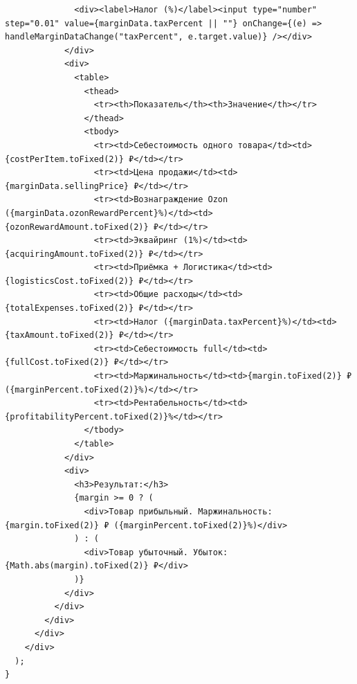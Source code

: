 \begin{code}
\begin{verbatim}
              <div><label>Налог (%)</label><input type="number" step="0.01" value={marginData.taxPercent || ""} onChange={(e) => handleMarginDataChange("taxPercent", e.target.value)} /></div>
            </div>
            <div>
              <table>
                <thead>
                  <tr><th>Показатель</th><th>Значение</th></tr>
                </thead>
                <tbody>
                  <tr><td>Себестоимость одного товара</td><td>{costPerItem.toFixed(2)} ₽</td></tr>
                  <tr><td>Цена продажи</td><td>{marginData.sellingPrice} ₽</td></tr>
                  <tr><td>Вознаграждение Ozon ({marginData.ozonRewardPercent}%)</td><td>{ozonRewardAmount.toFixed(2)} ₽</td></tr>
                  <tr><td>Эквайринг (1%)</td><td>{acquiringAmount.toFixed(2)} ₽</td></tr>
                  <tr><td>Приёмка + Логистика</td><td>{logisticsCost.toFixed(2)} ₽</td></tr>
                  <tr><td>Общие расходы</td><td>{totalExpenses.toFixed(2)} ₽</td></tr>
                  <tr><td>Налог ({marginData.taxPercent}%)</td><td>{taxAmount.toFixed(2)} ₽</td></tr>
                  <tr><td>Себестоимость full</td><td>{fullCost.toFixed(2)} ₽</td></tr>
                  <tr><td>Маржинальность</td><td>{margin.toFixed(2)} ₽ ({marginPercent.toFixed(2)}%)</td></tr>
                  <tr><td>Рентабельность</td><td>{profitabilityPercent.toFixed(2)}%</td></tr>
                </tbody>
              </table>
            </div>
            <div>
              <h3>Результат:</h3>
              {margin >= 0 ? (
                <div>Товар прибыльный. Маржинальность: {margin.toFixed(2)} ₽ ({marginPercent.toFixed(2)}%)</div>
              ) : (
                <div>Товар убыточный. Убыток: {Math.abs(margin).toFixed(2)} ₽</div>
              )}
            </div>
          </div>
        </div>
      </div>
    </div>
  );
}
\end{verbatim}
\end{code}
